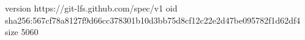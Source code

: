 version https://git-lfs.github.com/spec/v1
oid sha256:567cf78a8127f9d66cc378301b10d3bb75d8cf12c22e2d47be095782f1d62df4
size 5060
